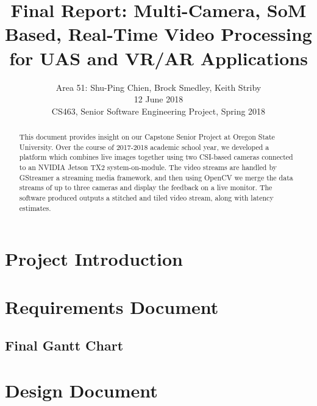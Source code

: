 \documentclass[letterpaper,10pt,serif,draftclsnofoot,onecolumn,compsoc,titlepage]{IEEEtran}
\title{Final Report: Multi-Camera, SoM Based, Real-Time Video Processing for UAS and VR/AR Applications}
\author{Area 51: Shu-Ping Chien, Brock Smedley, Keith Striby \\ 12 June 2018 \\ CS463, Senior Software Engineering Project, Spring 2018}
\begin{document}
\begin{titlepage}
\maketitle

\begin{abstract}

This document provides insight on our Capstone Senior Project at Oregon State University. 
Over the course of 2017-2018 academic school year, we developed a platform which combines 
live images together using two CSI-based cameras connected to an NVIDIA Jetson TX2 
system-on-module. The video streams are handled by GStreamer a streaming media 
framework, and then using OpenCV we merge the data streams of up to three cameras and 
display the feedback on a live monitor. The software produced outputs a stitched and 
tiled video stream, along with latency estimates. \\

\thispagestyle{empty}
\end{abstract}
\end{titlepage}

\newpage
\tableofcontents

\newpage

\section{Project Introduction}

	

\newpage

\section{Requirements Document}

	
\newpage

\subsection{Final Gantt Chart}

	

\newpage

\section{Design Document}

	
\end{document}
